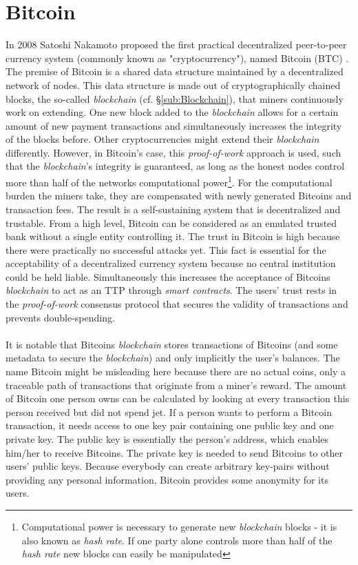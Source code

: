 \documentclass{cacthesis}
\newcounter{protocol}
\begin{document}
        \section{Bitcoin}
        \label{sec:BTC}
        In 2008 Satoshi Nakamoto proposed the first practical decentralized peer-to-peer currency system (commonly known as "cryptocurrency"), named Bitcoin (BTC) \cite{nakamoto2009bitcoin}. The premise of Bitcoin is a shared data structure maintained by a decentralized network of nodes. This data structure is made out of cryptographically chained blocks, the so-called \textit{blockchain} (cf. §\ref{sub:Blockchain}), that miners continuously work on extending. One new block added to the \textit{blockchain} allows for a certain amount of new payment transactions and simultaneously increases the integrity of the blocks before. Other cryptocurrencies might extend their \textit{blockchain} differently. However, in Bitcoin's case, this \textit{proof-of-work} approach is used, such that the \textit{blockchain}'s integrity is guaranteed, as long as the honest nodes control more than half of the networks computational power\footnote{Computational power is necessary to generate new \textit{blockchain} blocks - it is also known as \textit{hash rate}. If one party alone controls more than half of the \textit{hash rate} new blocks can easily be manipulated}. For the computational burden the miners take, they are compensated with newly generated Bitcoins and transaction fees. The result is a self-sustaining system that is decentralized and trustable. From a high level, Bitcoin can be considered as an emulated trusted bank without a single entity controlling it. The trust in Bitcoin is high because there were practically no successful attacks yet. This fact is essential for the acceptability of a decentralized currency system because no central institution could be held liable. Simultaneously this increases the acceptance of Bitcoins \textit{blockchain} to act as an TTP through \textit{smart contracts}. The users' trust rests in the \textit{proof-of-work} consensus protocol that secures the validity of transactions and prevents double-spending. \\\\
        It is notable that Bitcoins \textit{blockchain} stores transactions of Bitcoins (and some metadata to secure the \textit{blockchain}) and only implicitly the user's balances. The name Bitcoin might be misleading here because there are no actual coins, only a traceable path of transactions that originate from a miner's reward. The amount of Bitcoin one person owns can be calculated by looking at every transaction this person received but did not spend jet. If a person wants to perform a Bitcoin transaction, it needs access to one key pair containing one public key and one private key. The public key is essentially the person's address, which enables him/her to receive Bitcoins. The private key is needed to send Bitcoins to other users' public keys. Because everybody can create arbitrary key-pairs without providing any personal information, Bitcoin provides some anonymity for its users. \\
\end{document}
